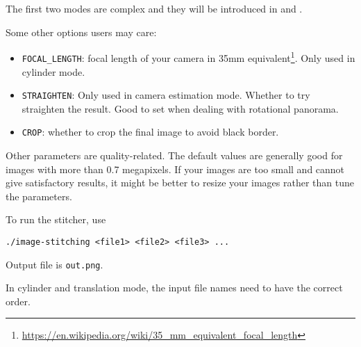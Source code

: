 The first two modes are complex and they will be introduced in 
and .


Some other options users may care:
\begin{itemize}
    \item \verb|FOCAL_LENGTH|: focal length of your camera in
      35mm equivalent\footnote{\url{https://en.wikipedia.org/wiki/35_mm_equivalent_focal_length}}. Only used in cylinder mode.
    \item \verb|STRAIGHTEN|: Only used in camera estimation mode. Whether to try straighten the result. Good to set when dealing with rotational panorama.
    \item \verb|CROP|: whether to crop the final image to avoid black border.
\end{itemize}

Other parameters are quality-related.
The default values are generally good for images with more than 0.7 megapixels.
If your images are too small and cannot give satisfactory results,
it might be better to resize your images rather than tune the parameters.

To run the stitcher, use
\begin{lstlisting}
./image-stitching <file1> <file2> <file3> ...
\end{lstlisting}

Output file is \verb|out.png|.


In cylinder and translation mode, the input file names need to have the correct order.


